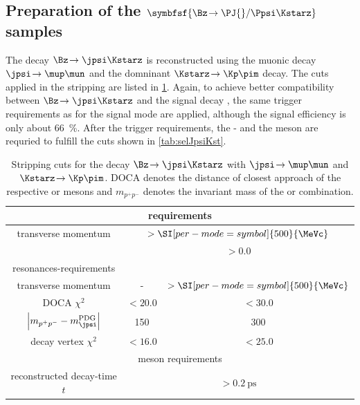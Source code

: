 \subsection[head={Preparation of the $\Bz\!\to\jpsi\Kstarz$ samples},tocentry={Preparation of the $\Bz\!\to\PJ{}/{}\Ppsi\Kstarz$ samples}]{Preparation of the $\symbfsf{\Bz\!\to\PJ{}/{}\Ppsi\Kstarz}$ samples}
\label{sec:PrepBd2JpsiKstSample}

The decay $\Bz\!\to\jpsi\Kstarz$ is reconstructed using the muonic decay $\jpsi\!\to\mup\mun$ and the domninant \mbox{$\Kstarz\!\to\Kp\pim$} decay.
The cuts applied in the stripping are listed in \cref{tab:JpsiKstStripping}.
Again, to achieve  better compatibility between $\Bz\!\to\jpsi\Kstarz$ and the signal decay \BdToDpi, the same trigger requirements as for the signal mode are applied, although the signal efficiency is only about \SI{66}{\percent}.
After the trigger requirements, the \Kstarz- and the \jpsi meson are requried to fulfill the cuts shown in \cref{tab:selJpsiKst}.
\begin{table}[tbp]
	\centering
	\caption{Stripping cuts for the decay $\Bz\!\to\jpsi\Kstarz$ with $\jpsi\!\to\mup\mun$ and $\Kstarz\!\to\Kp\pim$.
	DOCA denotes the distance of closest approach of the respective \Kstarz or \jpsi mesons and $m_{p^+p^-}$ denotes the invariant mass of the \mup\mun or \Kp\pim combination.}
	\begin{tabular}{ccc}
		\toprule
		\multicolumn{3}{c}{\muon requirements}\\
		\midrule
		transverse momentum \pt 	& \multicolumn{2}{c}{$>\SI[per-mode=symbol]{500}{\MeVc}$} \\
		\dllmupi					& \multicolumn{2}{c}{$>0.0$} \\
		\midrule
		resonances-requirements & \jpsi & \Kstarz\\
		\midrule
		transverse momentum \pt 							& - 								& $>\SI[per-mode=symbol]{500}{\MeVc}$ \\
		DOCA $\chi^2$										& $<20.0$ 							& $<30.0$ \\
		$\left|m_{p^+p^-}-m_{\jpsi}^{\text{PDG}}\right|$	& \SI[per-mode=symbol]{150}{\MeVcc} & \SI[per-mode=symbol]{300}{\MeVcc} \\
		decay vertex $\chi^2$ 								& $<16.0$ 							& $<25.0$ \\
		\midrule
		\multicolumn{3}{c}{\Bz meson requirements}\\
		\midrule
		reconstructed decay-time $t$ 	& \multicolumn{2}{c}{$>\SI{0.2}{\pico\second}$} \\
		\bottomrule
	\end{tabular}
	\label{tab:JpsiKstStripping}
\end{table}
